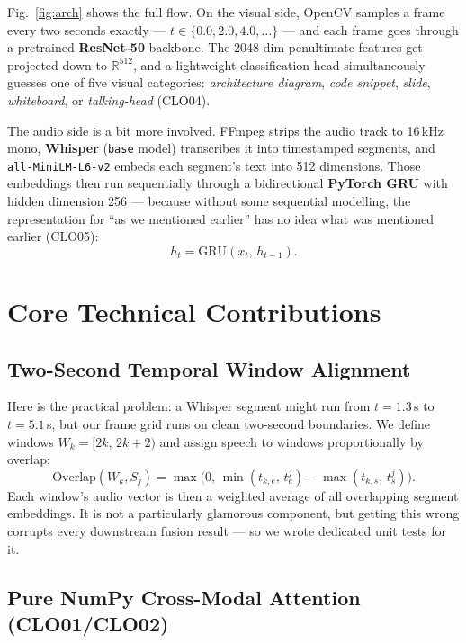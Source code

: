\documentclass[conference]{IEEEtran}
\begin{document}
Fig.~\ref{fig:arch} shows the full flow. On the visual side, OpenCV samples
a frame every two seconds exactly --- $t \in \{0.0, 2.0, 4.0, \ldots\}$ ---
and each frame goes through a pretrained \textbf{ResNet-50} backbone. The
2048-dim penultimate features get projected down to $\mathbb{R}^{512}$, and
a lightweight classification head simultaneously guesses one of five visual
categories: \textit{architecture diagram}, \textit{code snippet},
\textit{slide}, \textit{whiteboard}, or \textit{talking-head} (CLO04).

The audio side is a bit more involved. FFmpeg strips the audio track to
16\,kHz mono, \textbf{Whisper} (\texttt{base} model) transcribes it into
timestamped segments, and \texttt{all-MiniLM-L6-v2} embeds each segment's
text into 512 dimensions. Those embeddings then run sequentially through
a bidirectional \textbf{PyTorch GRU} with hidden dimension 256 --- because
without some sequential modelling, the representation for ``as we mentioned
earlier'' has no idea what was mentioned earlier (CLO05):
\begin{equation}
h_t = \text{GRU}(x_t,\, h_{t-1}).
\end{equation}

\section{Core Technical Contributions}

\subsection{Two-Second Temporal Window Alignment}

Here is the practical problem: a Whisper segment might run from $t=1.3$\,s
to $t=5.1$\,s, but our frame grid runs on clean two-second boundaries.
We define windows $W_k = [2k,\, 2k{+}2)$ and assign speech to windows
proportionally by overlap:
\begin{equation}
  \text{Overlap}(W_k, S_j)=\max\!\bigl(0,\,
  \min(t_{k,e},\,t_e^j)-\max(t_{k,s},\,t_s^j)\bigr).
\end{equation}
Each window's audio vector is then a weighted average of all overlapping
segment embeddings. It is not a particularly glamorous component, but
getting this wrong corrupts every downstream fusion result --- so we
wrote dedicated unit tests for it.

\subsection{Pure NumPy Cross-Modal Attention (CLO01/CLO02)}
\end{document}
